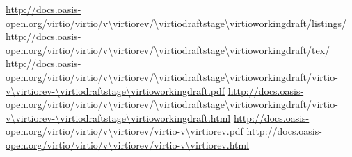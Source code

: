 
\newcommand{\virtioversion}{Virtual I/O Device (VIRTIO) Version \virtiorev}
\newcommand{\virtiospecfile}{virtio-v\virtiorev-\virtiodraftstage\virtioworkingdraft}
\newcommand{\virtiourlbase}{http://docs.oasis-open.org/virtio/virtio/v\virtiorev/\virtiodraftstage\virtioworkingdraft}
\urldef \virtiourllistings\url{\virtiourlbase/listings/}
\urldef \virtiourltex\url{\virtiourlbase/tex/}
\urldef \virtiourlpdf\url{\virtiourlbase/\virtiospecfile.pdf}
\urldef \virtiourlhtml\url{\virtiourlbase/\virtiospecfile.html}
\urldef \virtiourllatestpdf\url{http://docs.oasis-open.org/virtio/virtio/v\virtiorev/virtio-v\virtiorev.pdf}
\urldef \virtiourllatesthtml\url{http://docs.oasis-open.org/virtio/virtio/v\virtiorev/virtio-v\virtiorev.html}
\newcommand{\virtioworkproduct}{Standards Track Work Product}
\newcommand{\virtiooasiscopyright}{Copyright © OASIS Open 2014. All Rights Reserved.}

